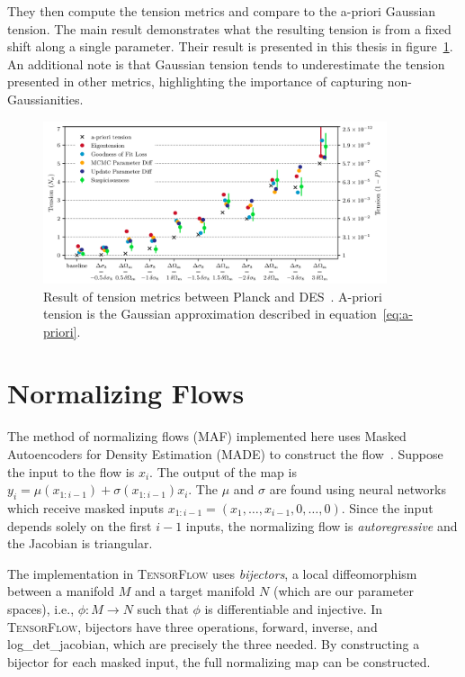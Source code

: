 They then compute the tension metrics and compare to the a-priori Gaussian tension. The main result demonstrates what the resulting tension is from a fixed shift along a single parameter. Their result is presented in this thesis in figure~\ref{fig:planck_des_tension}. An additional note is that Gaussian tension tends to underestimate the tension presented in other metrics, highlighting the importance of capturing non-Gaussianities.
\begin{figure}[tb]
	\centering
	\includegraphics[width=0.9\textwidth]{plots/planck_des_result.png}
	\caption{Result of tension metrics between Planck and DES~\cite{lemos_assessing_2021}. A-priori tension is the Gaussian approximation described in equation~\ref{eq:a-priori}.}
	\label{fig:planck_des_tension}
\end{figure}
\section{Normalizing Flows}
The method of normalizing flows (MAF) implemented here uses Masked Autoencoders for Density Estimation (MADE) to construct the flow~\cite{germain_made_2015,papamakarios_masked_2018,raveri_non-gaussian_2021}. 
Suppose the input to the flow is $x_i$. 
The output of the map is $y_i= \mu(x_{1:i-1})+\sigma(x_{1:i-1})x_i$. 
The $\mu$ and $\sigma$ are found using neural networks which receive masked inputs $x_{1:i-1}=(x_1,\ldots,x_{i-1},0,\ldots,0)$. 
Since the input depends solely on the first $i-1$ inputs, the normalizing flow is \textit{autoregressive} and the Jacobian is triangular.

The implementation in \textsc{TensorFlow} uses \textit{bijectors}, a local diffeomorphism between a manifold $M$ and a target manifold $N$ (which are our parameter spaces), i.e., $\phi:M\rightarrow N$ such that $\phi$ is differentiable and injective. 
In \textsc{TensorFlow}, bijectors have three operations, forward, inverse, and log\_det\_jacobian, which are precisely the three needed. 
By constructing a bijector for each masked input, the full normalizing map can be constructed.

